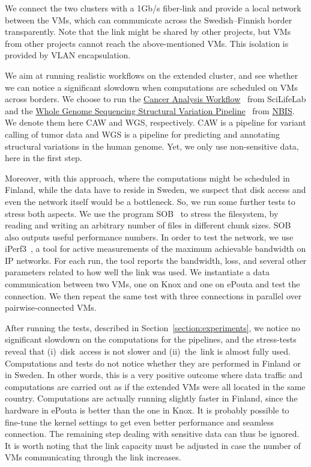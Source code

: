 We connect the two clusters with a 1Gb/s fiber-link and provide a
local network between the VMs, which can communicate across the
Swedish--Finnish border transparently.
%
Note that the link might be shared by other projects, but VMs from
other projects cannot reach the above-mentioned VMs.
%
This isolation is provided by VLAN encapsulation.


We aim at running realistic workflows on the extended cluster, and see
whether we can notice a significant slowdown when computations are
scheduled on VMs across borders.
%
We choose to run the \href{https://github.com/SciLifeLab/CAW}{Cancer
  Analysis Workflow}~\cite{caw} from SciLifeLab and the
\href{https://github.com/NBISweden/wgs-structvar}{Whole Genome
  Sequencing Structural Variation Pipeline}~\cite{caw} from
\href{http://www.nbis.se}{NBIS}.
%
We denote them here CAW and WGS, respectively.
%
CAW is a pipeline for variant calling of tumor data and WGS is a
pipeline for predicting and annotating structural variations in the
human genome.
%
Yet, we only use non-sensitive data, here in the first step.

Moreover, with this approach, where the computations might be
scheduled in Finland, while the data have to reside in Sweden, we
suspect that disk access and even the network itself would be a
bottleneck. So, we run some further tests to stress both aspects.
%
We use the program SOB~\cite{sob} to stress the filesystem, by reading
and writing an arbitrary number of files in different chunk sizes.
%
SOB also outputs useful performance numbers.
%
In order to test the network, we use iPerf3~\cite{iperf}, a tool for
active measurements of the maximum achievable bandwidth on IP
networks.
%
For each run, the tool reports the bandwidth, loss, and several other
parameters related to how well the link was used.
%
We instantiate a data communication between two VMs, one on Knox and
one on ePouta and test the connection.
%
We then repeat the same test with three connections in parallel over
pairwise-connected VMs.


After running the tests, described in
Section~\ref{section:experiments}, we notice no significant slowdown
on the computations for the pipelines, and the stress-tests reveal
that (i)~disk~access is not slower and (ii)~the~link is almost fully
used.
%
Computations and tests do not notice whether they are performed in
Finland or in Sweden.
%
In other words, this is a very positive outcome where data traffic and
computations are carried out as if the extended VMs were all located
in the same country.
%
Computations are actually running slightly faster in Finland, since
the hardware in ePouta is better than the one in Knox.
%
It is probably possible to fine-tune the kernel settings to get even
better performance and seamless connection.
%
The remaining step dealing with sensitive data can thus be ignored.
%
It is worth noting that the link capacity must be adjusted in case the
number of VMs communicating through the link increases.
